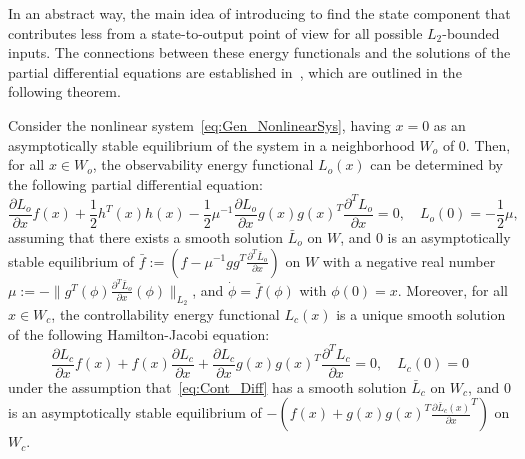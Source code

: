 In an abstract way, the main idea of introducing  to find the state component that contributes less from a state-to-output point of view for all possible $L_2$-bounded inputs. 
The connections between these energy functionals and the solutions of the partial differential equations  are established in~\cite{morgray1996,morSch93}, which are outlined in the following theorem.
\begin{theorem}\cite{morgray1996,morSch93}\label{thm:energy_function}
Consider the nonlinear system~\eqref{eq:Gen_NonlinearSys}, having $x = 0$ as an asymptotically stable equilibrium of the system in a neighborhood $W_o$ of $0$. Then, for all $x\in W_o$, the observability energy functional $L_o(x)$ can be determined  by the following partial differential equation:
\begin{equation}\label{eq:Obser_Diff}
 \dfrac{\partial L_o}{\partial x}  f(x) + \dfrac{1}{2}h^T(x)h(x) - \dfrac{1}{2}\mu^{-1}\dfrac{\partial L_o}{\partial x}g(x)g(x)^T\dfrac{\partial^T L_o}{\partial x} = 0,\quad L_o(0) = -\dfrac{1}{2}\mu,
\end{equation}
assuming that there exists a smooth solution $\bar{L}_o$ on $W$, and $0$ is an asymptotically stable equilibrium of $\bar{f}:= (f-\mu^{-1}gg^T\tfrac{\partial^T \bar{L}_o} {\partial x})$ on $W$  with a negative real number $\mu:= -\|g^T(\phi)\tfrac{\partial^T \bar{L}_o} {\partial x} (\phi) \|_{L_2}$, and $\dot{\phi} = \bar{f}(\phi)$ with $\phi(0) = x$.
 Moreover, for all $x\in W_c$, the controllability energy functional $L_c(x)$ is a unique smooth solution of the following Hamilton-Jacobi equation:
\begin{equation}\label{eq:Cont_Diff}
 \dfrac{\partial L_c}{\partial x} f(x) +  f(x)\dfrac{\partial L_c}{\partial x} + \dfrac{\partial L_c}{\partial x}g(x)g(x)^T\dfrac{\partial^T L_c}{\partial x} = 0,\quad L_c(0) = 0
\end{equation}
under the assumption that~\eqref{eq:Cont_Diff} has a smooth solution $\bar{L}_c$ on $W_c$, and $0$ is an asymptotically stable equilibrium of $-\left(f(x) + g(x)g(x)^T\tfrac{\partial\bar{L}_c(x)}{\partial x}^T\right)$ on $W_c$.
\end{theorem}

